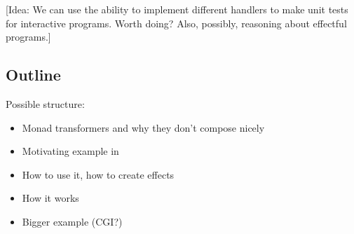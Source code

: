 [Idea: We can use the ability to implement different handlers to make
unit tests for interactive programs. Worth doing? Also, possibly, reasoning
about effectful programs.]

\subsection{Outline}

Possible structure:

\begin{itemize}
\item Monad transformers and why they don't compose nicely
\item Motivating example in \Idris{}
\item How to use it, how to create effects
\item How it works
\item Bigger example (CGI?)
\end{itemize}

